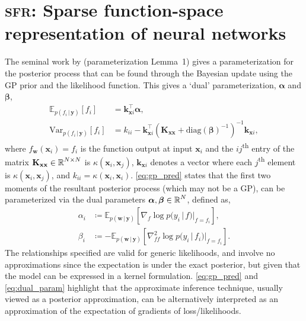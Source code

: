 \documentclass{article}
\renewcommand{\paragraph}[1]{{\bf #1}~~}
\newcommand{\our}{\textsc{sfr}\xspace}
\newcommand{\mathbold}[1]{\bm{#1}}
\newcommand{\mbf}[1]{\mathbf{#1}}
\renewcommand{\mid}{\,|\,}
\newcommand{\valpha}[0]{\mathbold{\alpha}}
\newcommand{\vbeta}[0]{\mathbold{\beta}}
\newcommand{\diag}{\text{{diag}}}
\newcommand{\vx}{\mbf{x}}
\newcommand{\vy}{\mbf{y}}
\newcommand{\vw}{\mbf{w}}
\newcommand{\MKxx}{\mbf{K}_{\mbf{x}\mbf{x}}}
\newcommand{\vk}{\mbf{k}}
\newcommand{\myexpect}{\mathbb{E}}
\begin{document}
\section{\our: Sparse function-space representation of neural networks}\label{sec:sfr}
The seminal work by \citet{csato2002sparse} (parameterization Lemma~1) gives a parameterization for the posterior process that can be found through the Bayesian update using the GP prior and the likelihood function. This gives a `dual' parameterization, $\valpha$ and $\vbeta$,
%
\begin{align}  \label{eq:gp_pred}
  \myexpect_{p(f_i \mid\vy)}[f_i] &= \vk_{\vx i}^\top \valpha, \\
  \mathrm{Var}_{p(f_i \mid \vy)}[f_i] &= k_{ii} - \vk_{\vx i}^\top ( \MKxx + \diag(\vbeta)^{-1})^{-1} \vk_{\vx i}, \nonumber
\end{align}
%
where $f_\vw(\vx_i) = f_i$ is the function output at input $\vx_i$
and the $ij$\textsuperscript{th} entry of the matrix $\MKxx \in \R^{N \times N}$ is $\kappa(\vx_i,\vx_j)$, $\vk_{\vx i}$ denotes a vector where each $j$\textsuperscript{th} element is $\kappa(\vx_i, \vx_j)$, and $k_{ii} = \kappa(\vx_i, \vx_i)$.
\cref{eq:gp_pred} states that the first two moments of the resultant posterior process (which may not be a GP), can be parameterized via the dual
parameters $\valpha, \vbeta \in \R^{N}$,
defined as, 
%
\begin{equation}
\begin{split}
  \label{eq:dual_param}
  \alpha_i &\coloneqq \myexpect_{p(\vw \mid \vy)}[\nabla_{f}\log p(y_i \mid f) |_{f=f_i}], \\
  \beta_i &\coloneqq - \myexpect_{p(\vw \mid \vy)}[\nabla^2_{f f}\log p(y_i \mid f_i) |_{f=f_i}].
  \end{split}
\end{equation}
%
The relationships specified are valid for generic likelihoods, and involve no approximations since the expectation is under the exact posterior, but given that the model can be expressed in a kernel formulation. \cref{eq:gp_pred} and \cref{eq:dual_param} highlight that the approximate inference technique, usually viewed as a posterior approximation, can be alternatively interpreted as an approximation of the expectation of gradients of loss/likelihoods.
\end{document}

